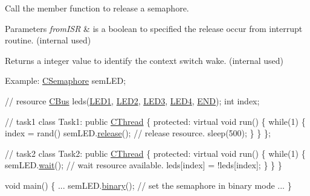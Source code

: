 Call the member function to release a semaphore. 
\begin{DoxyParams}{Parameters}
{\em from\-I\-S\-R} & is a boolean to specified the release occur from interrupt routine. (internal used) \\
\hline
\end{DoxyParams}
\begin{DoxyReturn}{Returns}
a integer value to identify the context switch wake. (internal used)
\end{DoxyReturn}

\begin{DoxyCode}
Example:
        \hyperlink{class_c_semaphore}{CSemaphore} semLED;

        \textcolor{comment}{// resource}
        \hyperlink{class_c_bus}{CBus} leds(\hyperlink{group___enumerations_gga65a2241721e4acb573e0c3fe29ac432fadac6477842247cab1a8c02c65f431b44}{LED1}, \hyperlink{group___enumerations_gga65a2241721e4acb573e0c3fe29ac432fa8379bbaa96d151e6adac488b2a147b7a}{LED2}, \hyperlink{group___enumerations_gga65a2241721e4acb573e0c3fe29ac432fa5dec293e081e0fc78369c842fab8452b}{LED3}, \hyperlink{group___enumerations_gga65a2241721e4acb573e0c3fe29ac432fad60e39b8d1701d30aa64f80343217342}{LED4}, \hyperlink{group___enumerations_gga65a2241721e4acb573e0c3fe29ac432fadc6f24fd6915a3f2786a1b7045406924}{END});
        \textcolor{keywordtype}{int}  index;

        \textcolor{comment}{// task1}
        \textcolor{keyword}{class }Task1: \textcolor{keyword}{public} \hyperlink{class_c_thread}{CThread} \{
        \textcolor{keyword}{protected}:
            \textcolor{keyword}{virtual} \textcolor{keywordtype}{void} run() \{
                \textcolor{keywordflow}{while}(1) \{
                    index = rand() %
                    semLED.\hyperlink{class_c_semaphore_aa1a25ff1be26f8dfdd0f008aeabec8b1}{release}();       \textcolor{comment}{// release resource.}
                    sleep(500);
                \}
            \}
        \};

        \textcolor{comment}{// task2}
        \textcolor{keyword}{class }Task2: \textcolor{keyword}{public} \hyperlink{class_c_thread}{CThread} \{
    \textcolor{keyword}{protected}:
            \textcolor{keyword}{virtual} \textcolor{keywordtype}{void} run() \{
                \textcolor{keywordflow}{while}(1) \{
                    semLED.\hyperlink{class_c_semaphore_abad6f22e40a0d911e38ade968f4d801a}{wait}();          \textcolor{comment}{// wait resource available.}
                    leds[index] = !leds[index];
                \}
            \}
        \}

        \textcolor{keywordtype}{void} main() \{
            ...
            semLED.\hyperlink{class_c_semaphore_a0fc078dfd286cb3321c6cbaf7bcbb7b2}{binary}();    \textcolor{comment}{// set the semaphore in binary mode}
            ...
        \}
\end{DoxyCode}
